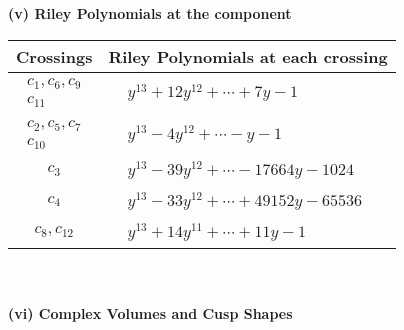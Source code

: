 \documentclass[1p]{elsarticle_modified}
\theoremstyle{definition}
\begin{document}
\newpage\renewcommand{\arraystretch}{1}
\flushleft \textbf{(v) Riley Polynomials at the component}\newline \\
\begin{tabular}{m{50pt}|m{274pt}}
Crossings & \hspace{64pt}Riley Polynomials at each crossing \\
\hline $$\begin{aligned}c_{1},c_{6},c_{9}\\c_{11}\end{aligned}$$&$\begin{aligned}
&y^{13}+12 y^{12}+\cdots+7 y-1
\end{aligned}$\\
\hline $$\begin{aligned}c_{2},c_{5},c_{7}\\c_{10}\end{aligned}$$&$\begin{aligned}
&y^{13}-4 y^{12}+\cdots- y-1
\end{aligned}$\\
\hline $$\begin{aligned}c_{3}\end{aligned}$$&$\begin{aligned}
&y^{13}-39 y^{12}+\cdots-17664 y-1024
\end{aligned}$\\
\hline $$\begin{aligned}c_{4}\end{aligned}$$&$\begin{aligned}
&y^{13}-33 y^{12}+\cdots+49152 y-65536
\end{aligned}$\\
\hline $$\begin{aligned}c_{8},c_{12}\end{aligned}$$&$\begin{aligned}
&y^{13}+14 y^{11}+\cdots+11 y-1
\end{aligned}$\\
\hline
\end{tabular}\\~\\
\newpage\flushleft \textbf{(vi) Complex Volumes and Cusp Shapes}
\end{document}
